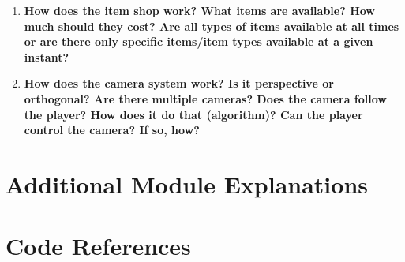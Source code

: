 \documentclass[12pt, titlepage]{article}
\begin{document}
\begin{enumerate}
	\item \textbf{How does the item shop work? What items are available? How much should they cost? Are all types of items available at all times or are there only specific items/item types available at a given instant?}

	\item \textbf{How does the camera system work? Is it perspective or orthogonal? Are there multiple cameras? Does the camera follow the player? How does it do that (algorithm)? Can the player control the camera? If so, how?}
\end{enumerate}

\section{Additional Module Explanations}




\section{Code References}
\end{document}
